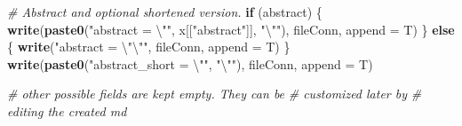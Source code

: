 \documentclass[12pt,]{book}
\newenvironment{Shaded}{\begin{snugshade}}{\end{snugshade}}
\newcommand{\KeywordTok}[1]{\textcolor[rgb]{0.13,0.29,0.53}{\textbf{#1}}}
\newcommand{\DataTypeTok}[1]{\textcolor[rgb]{0.13,0.29,0.53}{#1}}
\newcommand{\CharTok}[1]{\textcolor[rgb]{0.31,0.60,0.02}{#1}}
\newcommand{\StringTok}[1]{\textcolor[rgb]{0.31,0.60,0.02}{#1}}
\newcommand{\CommentTok}[1]{\textcolor[rgb]{0.56,0.35,0.01}{\textit{#1}}}
\newcommand{\ControlFlowTok}[1]{\textcolor[rgb]{0.13,0.29,0.53}{\textbf{#1}}}
\newcommand{\NormalTok}[1]{#1}
\theoremstyle{definition}
\theoremstyle{definition}
\theoremstyle{definition}
\theoremstyle{remark}
\begin{document}
\begin{Shaded}
\begin{Highlighting}[]
{{{{{{                             \CommentTok{# Abstract and optional shortened version.}
                             \ControlFlowTok{if}\NormalTok{ (abstract) \{}
                             \KeywordTok{write}\NormalTok{(}\KeywordTok{paste0}\NormalTok{(}\StringTok{"abstract = }\CharTok{\textbackslash{}"}\StringTok{"}\NormalTok{, x[[}\StringTok{"abstract"}\NormalTok{]], }\StringTok{"}\CharTok{\textbackslash{}"}\StringTok{"}\NormalTok{),}
\NormalTok{                             fileConn,}
                             \DataTypeTok{append =}\NormalTok{ T)}
\NormalTok{                             \} }\ControlFlowTok{else}\NormalTok{ \{}
                             \KeywordTok{write}\NormalTok{(}\StringTok{"abstract = }\CharTok{\textbackslash{}"\textbackslash{}"}\StringTok{"}\NormalTok{,}
\NormalTok{                             fileConn,}
                             \DataTypeTok{append =}\NormalTok{ T)}
\NormalTok{                             \}}
                             \KeywordTok{write}\NormalTok{(}\KeywordTok{paste0}\NormalTok{(}\StringTok{"abstract_short = }\CharTok{\textbackslash{}"}\StringTok{"}\NormalTok{, }\StringTok{"}\CharTok{\textbackslash{}"}\StringTok{"}\NormalTok{),}
\NormalTok{                             fileConn,}
                             \DataTypeTok{append =}\NormalTok{ T)}
                             
                             \CommentTok{# other possible fields are kept empty. They can be}
                             \CommentTok{# customized later by}
                             \CommentTok{# editing the created md}
                             
}}}}}}
\end{Highlighting}
\end{Shaded}
\end{document}
